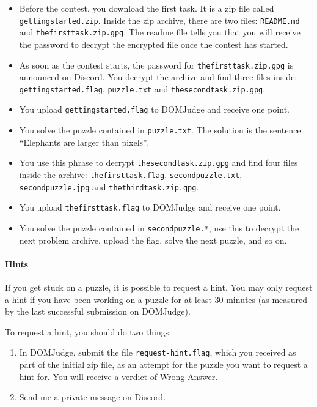 \documentclass[fontsize=10pt,a4paper,DIV=12,parskip=half]{scrarticle}
\begin{document}
\begin{itemize}
	\item Before the contest, you download the first task. It is a zip file called
		\texttt{gettingstarted.zip}. Inside the zip archive, there are two files:
		\texttt{README.md} and \texttt{thefirsttask.zip.gpg}. The readme file tells
		you that you will receive the password to decrypt the encrypted file once
		the contest has started.
	\item As soon as the contest starts, the password for \texttt{thefirsttask.zip.gpg}
		is announced on Discord. You decrypt the archive and find three files inside:
		\texttt{gettingstarted.flag}, \texttt{puzzle.txt} and \texttt{thesecondtask.zip.gpg}.
	\item You upload \texttt{gettingstarted.flag} to DOMJudge and receive one point.
	\item You solve the puzzle contained in \texttt{puzzle.txt}. The solution is the
		sentence \enquote{Elephants are larger than pixels}.
	\item You use this phrase to decrypt \texttt{thesecondtask.zip.gpg} and find
		four files inside the archive: \texttt{thefirsttask.flag}, \texttt{secondpuzzle.txt},
		\texttt{secondpuzzle.jpg} and \texttt{thethirdtask.zip.gpg}.
	\item You upload \texttt{thefirsttask.flag} to DOMJudge and receive one point.
	\item You solve the puzzle contained in \texttt{secondpuzzle.*}, use this to decrypt the
		next problem archive, upload the flag, solve the next puzzle, and so on.
\end{itemize}

\paragraph{Hints}
If you get stuck on a puzzle, it is possible to request a hint. You may only
request a hint if you have been working on a puzzle for at least 30 minutes
(as measured by the last successful submission on DOMJudge).

To request a hint, you should do two things:
\begin{enumerate}
	\item In DOMJudge, submit the file \texttt{request-hint.flag}, which you received
		as part of the initial zip file, as an attempt for the puzzle you
		want to request a hint for. You will receive a verdict of Wrong Answer.
	\item Send me a private message on Discord.
\end{enumerate}
\end{document}
